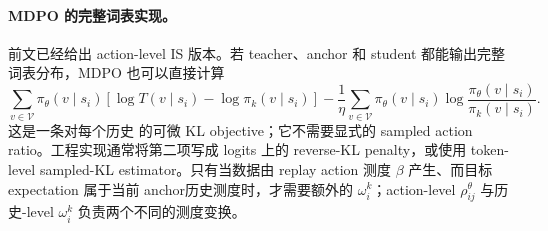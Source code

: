 \paragraph*{MDPO 的完整词表实现。}
前文已经给出 action-level IS 版本。若 teacher、anchor 和 student 都能输出完整词表分布，MDPO 也可以直接计算
\[
\sum_{v\in\mathcal V}\pi_\theta(v\mid s_i)
\left[\log T(v\mid s_i)-\log\pi_k(v\mid s_i)\right]
-\frac1\eta\sum_{v\in\mathcal V}\pi_\theta(v\mid s_i)
\log\frac{\pi_\theta(v\mid s_i)}{\pi_k(v\mid s_i)}.
\]
这是一条对每个历史 的可微 KL objective；它不需要显式的 sampled action ratio。工程实现通常将第二项写成 logits 上的 reverse-KL penalty，或使用 token-level sampled-KL estimator。只有当数据由 replay action 测度 $\beta$ 产生、而目标 expectation 属于当前 anchor历史测度时，才需要额外的 $\omega_i^k$；action-level $\rho_{ij}^{\theta}$ 与历史-level $\omega_i^k$ 负责两个不同的测度变换。
